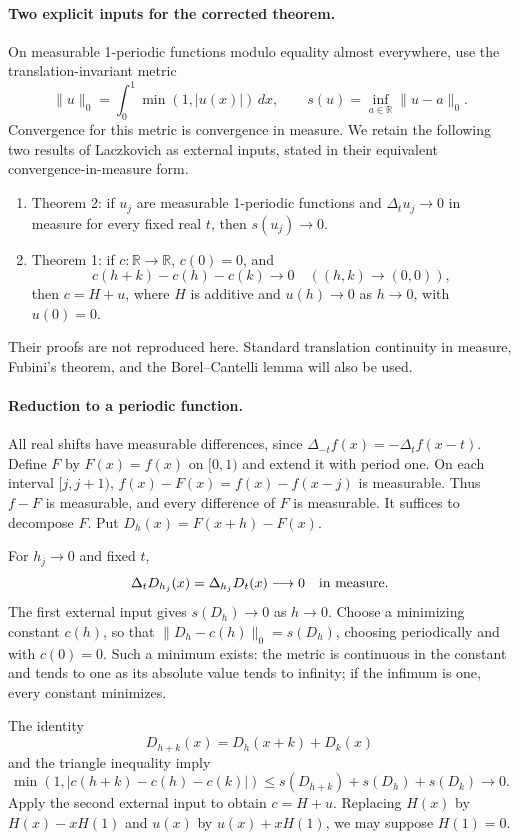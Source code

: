 \paragraph{Two explicit inputs for the corrected theorem.}
On measurable 1-periodic functions modulo equality
almost everywhere, use the translation-invariant metric
\[
 \|u\|_0=\int_0^1\min(1,|u(x)|)\,dx,\qquad
 s(u)=\inf_{a\in\mathbb R}\|u-a\|_0.
\]
Convergence for this metric is convergence in measure.
We retain the following two results of Laczkovich as
external inputs, stated in their equivalent
convergence-in-measure form.
\begin{enumerate}
\item Theorem 2: if \(u_j\) are measurable 1-periodic
functions and \(\Delta_tu_j\to0\) in measure for every
fixed real \(t\), then \(s(u_j)\to0\).
\item Theorem 1: if \(c:\mathbb R\to\mathbb R\),
\(c(0)=0\), and
\[
 c(h+k)-c(h)-c(k)\longrightarrow0\quad((h,k)\to(0,0)),
\]
then \(c=H+u\), where \(H\) is additive and \(u(h)\to0\)
as \(h\to0\), with \(u(0)=0\).
\end{enumerate}
Their proofs are not reproduced here. Standard
translation continuity in measure, Fubini's theorem,
and the Borel--Cantelli lemma will also be used.

\paragraph{Reduction to a periodic function.}
All real shifts have measurable differences, since
\(\Delta_{-t}f(x)=-\Delta_tf(x-t)\).
Define \(F\) by \(F(x)=f(x)\) on \([0,1)\) and
extend it with period one.
On each interval \([j,j+1)\),
\(f(x)-F(x)=f(x)-f(x-j)\) is measurable.
Thus \(f-F\) is measurable, and every difference of
\(F\) is measurable. It suffices to decompose \(F\).
Put \(D_h(x)=F(x+h)-F(x)\).

For \(h_j\to0\) and fixed \(t\),
\[
 \Delta_tD_{h_j}(x)=\Delta_{h_j}D_t(x)\longrightarrow0
 \quad\hbox{in measure}.
\]
The first external input gives \(s(D_h)\to0\) as \(h\to0\).
Choose a minimizing constant \(c(h)\), so that
\(\|D_h-c(h)\|_0=s(D_h)\), choosing periodically
and with \(c(0)=0\).
Such a minimum exists: the metric is continuous in the
constant and tends to one as its absolute value tends
to infinity; if the infimum is one, every constant minimizes.

The identity
\[
 D_{h+k}(x)=D_h(x+k)+D_k(x)
\]
and the triangle inequality imply
\[
 \min(1,|c(h+k)-c(h)-c(k)|)
 \leq s(D_{h+k})+s(D_h)+s(D_k)\longrightarrow0.
\]
Apply the second external input to obtain \(c=H+u\).
Replacing \(H(x)\) by \(H(x)-xH(1)\) and \(u(x)\)
by \(u(x)+xH(1)\), we may suppose \(H(1)=0\).

